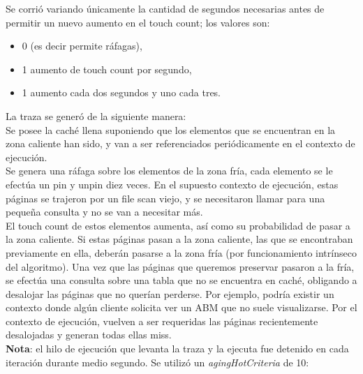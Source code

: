 \documentclass[11pt, a4paper, spanish]{article}
\begin{document}
Se corri\'o variando \'unicamente la cantidad de segundos necesarias antes de permitir un nuevo aumento en el touch count; los valores son: 
\begin{itemize}
	\item{0 (es decir permite r\'afagas), }
	\item{1 aumento de touch count por segundo, }
	\item{1 aumento cada dos segundos y uno cada tres.}
\end{itemize}

La traza se gener\'o de la siguiente manera:\\

    Se posee la cach\'e llena suponiendo que los elementos que se encuentran en la zona caliente han sido, y van a ser referenciados peri\'odicamente en el contexto de ejecuci\'on.\\

    Se genera una r\'afaga sobre los elementos de la zona fr\'ia, cada elemento se le efect\'ua un pin y unpin diez veces. En el supuesto contexto de ejecuci\'on, estas p\'aginas se trajeron por un file scan viejo, y se necesitaron llamar para una peque\~{n}a consulta y no se van
 a necesitar m\'as. \\

El touch count de estos elementos aumenta, as\'i como su probabilidad de pasar a la zona caliente.
    Si estas p\'aginas pasan a la zona caliente, las que se encontraban previamente en ella, deber\'an pasarse a la zona fr\'ia (por funcionamiento intr\'inseco del algoritmo).
    Una vez que las p\'aginas que queremos preservar pasaron a la fr\'ia, se efect\'ua una consulta sobre una tabla que no se encuentra en cach\'e, obligando a desalojar las p\'aginas que no quer\'ian perderse. Por ejemplo, podr\'ia existir un contexto donde alg\'un cliente solicita ver un ABM que no suele visualizarse.
    Por el contexto de ejecuci\'on, vuelven a ser requeridas las p\'aginas recientemente desalojadas y generan todas ellas miss.\\


\textbf{Nota}: el hilo de ejecuci\'on que levanta la traza y la ejecuta fue detenido en cada iteraci\'on durante medio segundo. Se utiliz\'o un \textit{agingHotCriteria} de 10:
\end{document}
